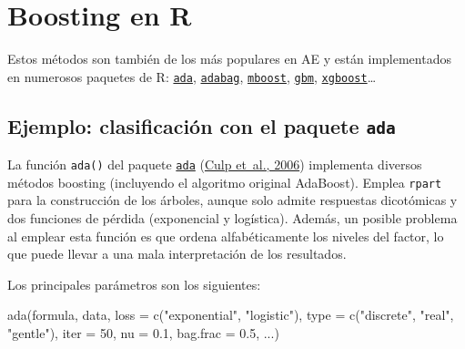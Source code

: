 \documentclass[
]{book}
\newenvironment{Shaded}{\begin{snugshade}}{\end{snugshade}}
\newcommand{\AttributeTok}[1]{\textcolor[rgb]{0.77,0.63,0.00}{#1}}
\newcommand{\DecValTok}[1]{\textcolor[rgb]{0.00,0.00,0.81}{#1}}
\newcommand{\FloatTok}[1]{\textcolor[rgb]{0.00,0.00,0.81}{#1}}
\newcommand{\FunctionTok}[1]{\textcolor[rgb]{0.00,0.00,0.00}{#1}}
\newcommand{\NormalTok}[1]{#1}
\newcommand{\StringTok}[1]{\textcolor[rgb]{0.31,0.60,0.02}{#1}}
\theoremstyle{break}
\theoremstyle{nonumberplain}
\begin{document}
\hypertarget{boosting-en-r}{%
\section{Boosting en R}\label{boosting-en-r}}

Estos métodos son también de los más populares en AE y están implementados en numerosos paquetes de R: \href{https://CRAN.R-project.org/package=ada}{\texttt{ada}}, \href{https://CRAN.R-project.org/package=adabag}{\texttt{adabag}}, \href{https://CRAN.R-project.org/package=mboost}{\texttt{mboost}}, \href{https://CRAN.R-project.org/package=gbm}{\texttt{gbm}}, \href{https://github.com/dmlc/xgboost/tree/master/R-package}{\texttt{xgboost}}\ldots{}

\hypertarget{ejemplo-clasificaciuxf3n-con-el-paquete-ada}{%
\subsection{\texorpdfstring{Ejemplo: clasificación con el paquete \texttt{ada}}{Ejemplo: clasificación con el paquete ada}}\label{ejemplo-clasificaciuxf3n-con-el-paquete-ada}}

La función \texttt{ada()} del paquete \href{https://CRAN.R-project.org/package=ada}{\texttt{ada}} (\protect\hyperlink{ref-culp2006ada}{Culp et~al., 2006}) implementa diversos métodos boosting (incluyendo el algoritmo original AdaBoost).
Emplea \texttt{rpart} para la construcción de los árboles, aunque solo admite respuestas dicotómicas y dos funciones de pérdida (exponencial y logística).
Además, un posible problema al emplear esta función es que ordena alfabéticamente los niveles del factor, lo que puede llevar a una mala interpretación de los resultados.

Los principales parámetros son los siguientes:

\begin{Shaded}
\begin{Highlighting}[]
\FunctionTok{ada}\NormalTok{(formula, data, }\AttributeTok{loss =} \FunctionTok{c}\NormalTok{(}\StringTok{"exponential"}\NormalTok{, }\StringTok{"logistic"}\NormalTok{),}
    \AttributeTok{type =} \FunctionTok{c}\NormalTok{(}\StringTok{"discrete"}\NormalTok{, }\StringTok{"real"}\NormalTok{, }\StringTok{"gentle"}\NormalTok{), }\AttributeTok{iter =} \DecValTok{50}\NormalTok{, }
    \AttributeTok{nu =} \FloatTok{0.1}\NormalTok{, }\AttributeTok{bag.frac =} \FloatTok{0.5}\NormalTok{, ...)}
\end{Highlighting}
\end{Shaded}
\end{document}
